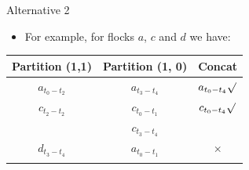 \documentclass{beamer}
\begin{document}
\begin{frame}{Alternative 2}
    \begin{itemize}
        \item For example, for flocks $a$, $c$ and $d$ we have:  
    \end{itemize}
    \centering
    \begin{tabular}{ c c c }
        \hline
        Partition (1,1) & Partition (1, 0)  & Concat \\
        \hline
        $a_{t_0-t_2}$   & $a_{t_3-t_4}$     & $a_{t_0-t_4}\surd$    \\
        \arrayrulecolor{lightgray}\hline
        $c_{t_2-t_2}$   & $c_{t_0-t_1}$     & $c_{t_0-t_4}\surd$    \\
                        & $c_{t_3-t_4}$     &                       \\
        \hline
        $d_{t_3-t_4}$   & $a_{t_0-t_1}$     & $\times$              \\
        \arrayrulecolor{black}\hline
    \end{tabular}
\end{frame}
\end{document}
